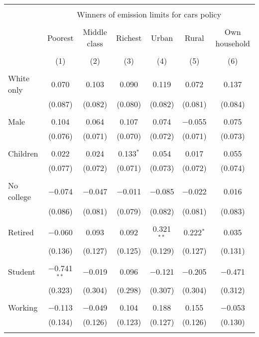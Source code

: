 
\begin{tabular}{@{\extracolsep{5pt}}lcccccc} 
\\[-1.8ex]\hline 
\hline \\[-1.8ex] 
 & \multicolumn{6}{c}{Winners of emission limits for cars policy} \\ 
\cline{2-7} 
\\[-1.8ex] & Poorest & Middle class & Richest & Urban & Rural & Own household \\ 
\\[-1.8ex] & (1) & (2) & (3) & (4) & (5) & (6)\\ 
\hline \\[-1.8ex] 
 White only & 0.070 & 0.103 & 0.090 & 0.119 & 0.072 & 0.137 \\ 
  & (0.087) & (0.082) & (0.080) & (0.082) & (0.081) & (0.084) \\ 
  & & & & & & \\ 
 Male & 0.104 & 0.064 & 0.107 & 0.074 & $-$0.055 & 0.075 \\ 
  & (0.076) & (0.071) & (0.070) & (0.072) & (0.071) & (0.073) \\ 
  & & & & & & \\ 
 Children & 0.022 & 0.024 & 0.133$^{*}$ & 0.054 & 0.017 & 0.055 \\ 
  & (0.077) & (0.072) & (0.071) & (0.073) & (0.072) & (0.074) \\ 
  & & & & & & \\ 
 No college & $-$0.074 & $-$0.047 & $-$0.011 & $-$0.085 & $-$0.022 & 0.016 \\ 
  & (0.086) & (0.081) & (0.079) & (0.082) & (0.081) & (0.083) \\ 
  & & & & & & \\ 
 Retired & $-$0.060 & 0.093 & 0.092 & 0.321$^{**}$ & 0.222$^{*}$ & 0.035 \\ 
  & (0.136) & (0.127) & (0.125) & (0.129) & (0.127) & (0.131) \\ 
  & & & & & & \\ 
 Student & $-$0.741$^{**}$ & $-$0.019 & 0.096 & $-$0.121 & $-$0.205 & $-$0.471 \\ 
  & (0.323) & (0.304) & (0.298) & (0.307) & (0.304) & (0.312) \\ 
  & & & & & & \\ 
 Working & $-$0.113 & $-$0.049 & 0.104 & 0.188 & 0.155 & $-$0.053 \\ 
  & (0.134) & (0.126) & (0.123) & (0.127) & (0.126) & (0.130) \\ 
  & & & & & & \\ 

\end{tabular}
